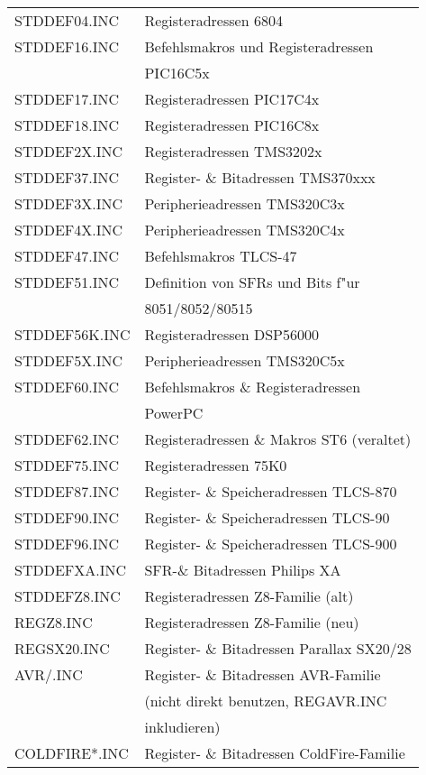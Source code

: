 \documentclass[12pt,a4paper,twoside]{report}
\begin{document}
\begin{center}
\begin{longtable}{|l|l|}
STDDEF04.INC      & Registeradressen 6804 \\
STDDEF16.INC      & Befehlsmakros und Registeradressen \\
                  & PIC16C5x \\
STDDEF17.INC      & Registeradressen PIC17C4x \\
STDDEF18.INC      & Registeradressen PIC16C8x \\
STDDEF2X.INC      & Registeradressen TMS3202x \\
STDDEF37.INC      & Register- \& Bitadressen TMS370xxx \\
STDDEF3X.INC      & Peripherieadressen TMS320C3x \\
STDDEF4X.INC      & Peripherieadressen TMS320C4x \\
STDDEF47.INC      & Befehlsmakros TLCS-47 \\
STDDEF51.INC      & Definition von SFRs und Bits f"ur \\
                  & 8051/8052/80515 \\
STDDEF56K.INC     & Registeradressen DSP56000 \\
STDDEF5X.INC      & Peripherieadressen TMS320C5x \\
STDDEF60.INC      & Befehlsmakros \& Registeradressen \\
                  & PowerPC \\
STDDEF62.INC      & Registeradressen \& Makros ST6 (veraltet)\\
STDDEF75.INC      & Registeradressen 75K0 \\
STDDEF87.INC      & Register- \& Speicheradressen TLCS-870 \\
STDDEF90.INC      & Register- \& Speicheradressen TLCS-90 \\
STDDEF96.INC      & Register- \& Speicheradressen TLCS-900 \\
STDDEFXA.INC      & SFR-\& Bitadressen Philips XA \\
STDDEFZ8.INC      & Registeradressen Z8-Familie (alt)\\
REGZ8.INC         & Registeradressen Z8-Familie (neu)\\
REGSX20.INC       & Register- \& Bitadressen Parallax SX20/28 \\
AVR/\*.INC        & Register- \& Bitadressen AVR-Familie \\
                  & (nicht direkt benutzen, REGAVR.INC \\
                  & inkludieren) \\
COLDFIRE\/*.INC   & Register- \& Bitadressen ColdFire-Familie \\

\end{longtable}
\end{center}
\end{document}
